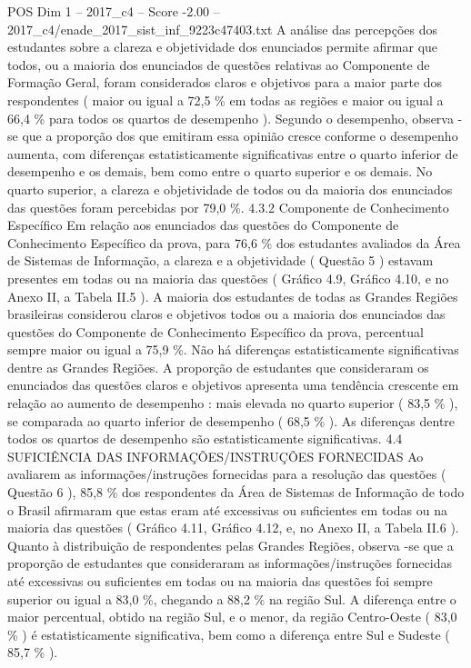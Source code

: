 \begin{textsample}{POS Dim 1 – 2017\_c4 – Score -2.00 – 2017\_c4/enade\_2017\_sist\_inf\_9223c47403.txt}
A análise das percepções dos estudantes sobre a clareza e objetividade dos enunciados permite afirmar que todos, ou a maioria dos enunciados de questões relativas ao Componente de Formação Geral, foram considerados claros e objetivos para a maior parte dos respondentes ( maior ou igual a 72,5 \% em todas as regiões e maior ou igual a 66,4 \% para todos os quartos de desempenho ).
Segundo o desempenho, observa -se que a proporção dos que emitiram essa opinião cresce conforme o desempenho aumenta, com diferenças estatisticamente significativas entre o quarto inferior de desempenho e os demais, bem como entre o quarto superior e os demais.
No quarto superior, a clareza e objetividade de todos ou da maioria dos enunciados das questões foram percebidas por 79,0 \%. 4.3.2 Componente de Conhecimento Específico Em relação aos enunciados das questões do Componente de Conhecimento Específico da prova, para 76,6 \% dos estudantes avaliados da Área de Sistemas de Informação, a clareza e a objetividade ( Questão 5 ) estavam presentes em todas ou na maioria das questões ( Gráfico 4.9, Gráfico 4.10, e no Anexo II, a Tabela II.5 ).
A maioria dos estudantes de todas as Grandes Regiões brasileiras considerou claros e objetivos todos ou a maioria dos enunciados das questões do Componente de Conhecimento Específico da prova, percentual sempre maior ou igual a 75,9 \%.
Não há diferenças estatisticamente significativas dentre as Grandes Regiões.
A proporção de estudantes que consideraram os enunciados das questões claros e objetivos apresenta uma tendência crescente em relação ao aumento de desempenho : mais elevada no quarto superior ( 83,5 \% ), se comparada ao quarto inferior de desempenho ( 68,5 \% ).
As diferenças dentre todos os quartos de desempenho são estatisticamente significativas. 4.4 SUFICIÊNCIA DAS INFORMAÇÕES/INSTRUÇÕES FORNECIDAS Ao avaliarem as informações/instruções fornecidas para a resolução das questões ( Questão 6 ), 85,8 \% dos respondentes da Área de Sistemas de Informação de todo o Brasil afirmaram que estas eram até excessivas ou suficientes em todas ou na maioria das questões ( Gráfico 4.11, Gráfico 4.12, e, no Anexo II, a Tabela II.6 ).
Quanto à distribuição de respondentes pelas Grandes Regiões, observa -se que a proporção de estudantes que consideraram as informações/instruções fornecidas até excessivas ou suficientes em todas ou na maioria das questões foi sempre superior ou igual a 83,0 \%, chegando a 88,2 \% na região Sul.
A diferença entre o maior percentual, obtido na região Sul, e o menor, da região Centro-Oeste ( 83,0 \% ) é estatisticamente significativa, bem como a diferença entre Sul e Sudeste ( 85,7 \% ).

\end{textsample}
